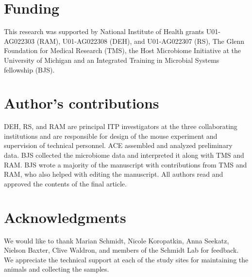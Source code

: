 \documentclass{doc/template/bmcart-nofigbox}
\begin{document}
\begin{backmatter}
\section*{Funding}

This research was supported by National Institute of Health grants
U01-AG022303 (RAM), U01-AG022308 (DEH), and U01-AG022307 (RS),
The Glenn Foundation for Medical Research (TMS),
the Host Microbiome Initiative at the University of Michigan and
an Integrated Training in Microbial Systems fellowship (BJS).

\section*{Author's contributions}

DEH, RS, and RAM are principal ITP investigators at the three collaborating
institutions and are responsible for design of the mouse experiment and
supervision of technical personnel.
ACE assembled and analyzed preliminary data.
BJS collected the microbiome data and interpreted it along with TMS and RAM\@.
BJS wrote a majority of the manuscript with contributions from TMS and RAM, who
also helped with editing the manuscript.
All authors read and approved the contents of the final article.

\section*{Acknowledgments}


We would like to thank Marian Schmidt, Nicole Koropatkin, Anna Seekatz, Nielson
Baxter, Clive Waldron,
and members of the Schmidt Lab for feedback.
We appreciate the technical support at each of the study sites for maintaining
the animals and collecting the samples.





\end{backmatter}
\end{document}

